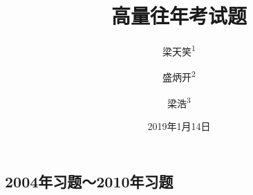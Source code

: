\documentclass[12pt]{article}
\title{\Huge{高量往年考试题}}
\author{梁天笑\textsuperscript{1} \and 盛炳开\textsuperscript{2} \and 梁浩\textsuperscript{3}}	%
\date{2019年1月14日}
\numberwithin{equation}{section}	 %
\begin{document}
\maketitle
\setlength{\parindent}{0pt}	%
\thispagestyle{empty}		%


\newpage
\thispagestyle{empty}		%
\renewcommand\contentsname{\centering{目\qquad 录}}
\tableofcontents


\begin{spacing}{1.5}			%
\newcommand*{\dif}{\mathop{}\!\mathrm{d}} 		%


\newpage
\setcounter{page}{1}			%
\section{2004年习题～2010年习题}

\end{spacing}
\end{document}
